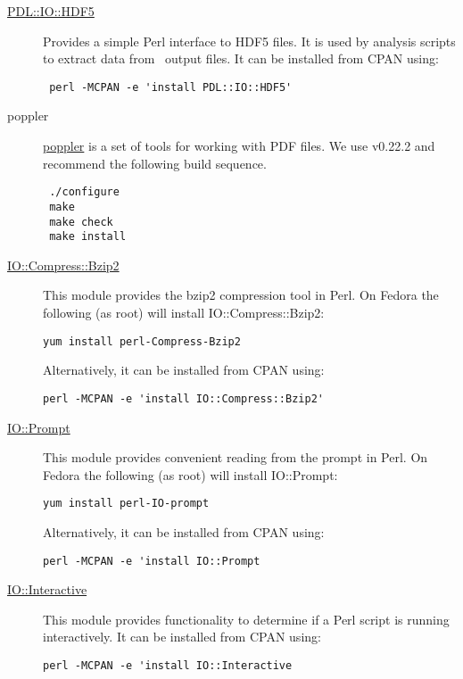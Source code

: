 \begin{description}
\item [\href{http://search.cpan.org/~chm/PDL-IO-HDF5-0.6501/hdf5.pd}{{\normalfont \ttfamily PDL::IO::HDF5}}] Provides a simple Perl interface to HDF5 files. It is used by analysis scripts to extract data from \glc\ output files. It can be installed from CPAN using:
\begin{verbatim}
 perl -MCPAN -e 'install PDL::IO::HDF5'
\end{verbatim}

\item [poppler] \href{http://poppler.freedesktop.org/}{poppler} is a set of tools for working with PDF files. We use v0.22.2 and recommend the following build sequence. 
\begin{verbatim}
 ./configure
 make
 make check
 make install
\end{verbatim}

  \item [\href{http://perldoc.perl.org/IO/Compress/Bzip2.html}{{\normalfont \ttfamily IO::Compress::Bzip2}}] This module provides the {\normalfont \ttfamily bzip2} compression tool in Perl. On Fedora the following (as root) will install {\normalfont \ttfamily IO::Compress::Bzip2}:
\begin{verbatim}
yum install perl-Compress-Bzip2
\end{verbatim}
Alternatively, it can be installed from CPAN using:
\begin{verbatim}
perl -MCPAN -e 'install IO::Compress::Bzip2'
\end{verbatim}

  \item [\href{http://search.cpan.org/~dconway/IO-Prompt-0.997002/lib/IO/Prompt.pm}{{\normalfont \ttfamily IO::Prompt}}] This module provides convenient reading from the prompt in Perl. On Fedora the following (as root) will install {\normalfont \ttfamily IO::Prompt}:
\begin{verbatim}
yum install perl-IO-prompt
\end{verbatim}
Alternatively, it can be installed from CPAN using:
\begin{verbatim}
perl -MCPAN -e 'install IO::Prompt
\end{verbatim}

  \item [\href{http://search.cpan.org/~bdfoy/IO-Interactive-0.0.6/lib/IO/Interactive.pm}{{\normalfont \ttfamily IO::Interactive}}] This module provides functionality to determine if a Perl script is running interactively. It can be installed from CPAN using:
\begin{verbatim}
perl -MCPAN -e 'install IO::Interactive
\end{verbatim}


\end{description}
